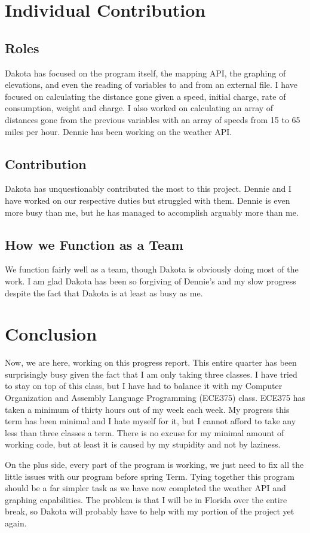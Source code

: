 \begin{singlespace}
\section{Individual Contribution}
\subsection{Roles}
Dakota has focused on the program itself, the mapping API, the graphing of elevations, and even the reading of variables to and from an external file.
I have focused on calculating the distance gone given a speed, initial charge, rate of consumption, weight and charge.
I also worked on calculating an array of distances gone from the previous variables with an array of speeds from 15 to 65 miles per hour.
Dennie has been working on the weather API.

\subsection{Contribution}
Dakota has unquestionably contributed the most to this project.
Dennie and I have worked on our respective duties but struggled with them.
Dennie is even more busy than me, but he has managed to accomplish arguably more than me.

\subsection{How we Function as a Team}
We function fairly well as a team, though Dakota is obviously doing most of the work.
I am glad Dakota has been so forgiving of Dennie's and my slow progress despite the fact that Dakota is at least as busy as me.

\section{Conclusion}
Now, we are here, working on this progress report.
This entire quarter has been surprisingly busy given the fact that I am only taking three classes.
I have tried to stay on top of this class, but I have had to balance it with my Computer Organization and Assembly Language Programming (ECE375) class.
ECE375 has taken a minimum of thirty hours out of my week each week.
My progress this term has been minimal and I hate myself for it, but I cannot afford to take any less than three classes a term.
There is no excuse for my minimal amount of working code, but at least it is caused by my stupidity and not by laziness.

On the plus side, every part of the program is working, we just need to fix all the little issues with our program before spring Term.
Tying together this program should be a far simpler task as we have now completed the weather API and graphing capabilities.
The problem is that I will be in Florida over the entire break, so Dakota will probably have to help with my portion of the project yet again.






\end{singlespace}

